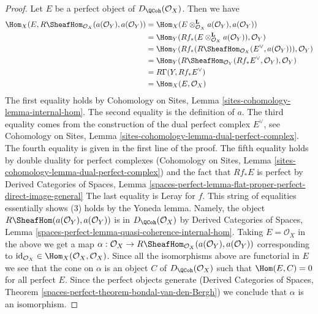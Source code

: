 \begin{proof}
\medskip\noindent
Let $E$ be a perfect object of $D_\QCoh(\mathcal{O}_X)$. Then
we have
\begin{align*}
\Hom_X(E, R\SheafHom_{\mathcal{O}_X}(a(\mathcal{O}_Y), a(\mathcal{O}_Y))
& =
\Hom_X(E \otimes_{\mathcal{O}_X}^\mathbf{L} a(\mathcal{O}_Y),
a(\mathcal{O}_Y)) \\
& =
\Hom_Y(Rf_*(E \otimes_{\mathcal{O}_X}^\mathbf{L} a(\mathcal{O}_Y)),
\mathcal{O}_Y) \\
& =
\Hom_Y(Rf_*(R\SheafHom_{\mathcal{O}_X}(E^\vee, a(\mathcal{O}_Y))),
\mathcal{O}_Y) \\
& =
\Hom_Y(R\SheafHom_{\mathcal{O}_Y}(Rf_*E^\vee, \mathcal{O}_Y),
\mathcal{O}_Y) \\
& =
R\Gamma(Y, Rf_*E^\vee) \\
& =
\Hom_X(E, \mathcal{O}_X)
\end{align*}
The first equality holds by Cohomology on Sites, Lemma
\ref{sites-cohomology-lemma-internal-hom}.
The second equality is the definition of $a$.
The third equality comes from the construction of the dual perfect
complex $E^\vee$, see Cohomology on Sites, Lemma
\ref{sites-cohomology-lemma-dual-perfect-complex}.
The fourth equality is given in the first line of the proof.
The fifth equality holds by double duality for perfect complexes
(Cohomology on Sites, Lemma
\ref{sites-cohomology-lemma-dual-perfect-complex})
and the fact that $Rf_*E$ is perfect by
Derived Categories of Spaces, Lemma
\ref{spaces-perfect-lemma-flat-proper-perfect-direct-image-general}
The last equality is Leray for $f$.
This string of equalities essentially shows (3)
holds by the Yoneda lemma. Namely, the object
$R\SheafHom(a(\mathcal{O}_Y), a(\mathcal{O}_Y))$
is in $D_\QCoh(\mathcal{O}_X)$ by Derived Categories of Spaces, Lemma
\ref{spaces-perfect-lemma-quasi-coherence-internal-hom}.
Taking $E = \mathcal{O}_X$ in the above we get a map
$\alpha : \mathcal{O}_X \to
R\SheafHom_{\mathcal{O}_X}(a(\mathcal{O}_Y), a(\mathcal{O}_Y))$
corresponding to
$\text{id}_{\mathcal{O}_X} \in \Hom_X(\mathcal{O}_X, \mathcal{O}_X)$.
Since all the isomorphisms above are functorial in $E$ we
see that the cone on $\alpha$ is an object $C$ of $D_\QCoh(\mathcal{O}_X)$
such that $\Hom(E, C) = 0$ for all perfect $E$.
Since the perfect objects generate
(Derived Categories of Spaces, Theorem
\ref{spaces-perfect-theorem-bondal-van-den-Bergh})
we conclude that $\alpha$ is an isomorphism.
\end{proof}










